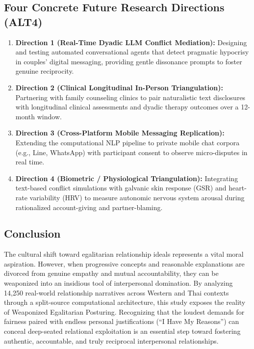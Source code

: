 \subsection{Four Concrete Future Research Directions (ALT4)}
\begin{enumerate}[leftmargin=*]
    \item \textbf{Direction 1 (Real-Time Dyadic LLM Conflict Mediation):} Designing and testing automated conversational agents that detect pragmatic hypocrisy in couples' digital messaging, providing gentle dissonance prompts to foster genuine reciprocity.
    \item \textbf{Direction 2 (Clinical Longitudinal In-Person Triangulation):} Partnering with family counseling clinics to pair naturalistic text disclosures with longitudinal clinical assessments and dyadic therapy outcomes over a 12-month window.
    \item \textbf{Direction 3 (Cross-Platform Mobile Messaging Replication):} Extending the computational NLP pipeline to private mobile chat corpora (e.g., Line, WhatsApp) with participant consent to observe micro-disputes in real time.
    \item \textbf{Direction 4 (Biometric / Physiological Triangulation):} Integrating text-based conflict simulations with galvanic skin response (GSR) and heart-rate variability (HRV) to measure autonomic nervous system arousal during rationalized account-giving and partner-blaming.
\end{enumerate}

\subsection{Conclusion}
The cultural shift toward egalitarian relationship ideals represents a vital moral aspiration. However, when progressive concepts and reasonable explanations are divorced from genuine empathy and mutual accountability, they can be weaponized into an insidious tool of interpersonal domination. By analyzing 14,250 real-world relationship narratives across Western and Thai contexts through a split-source computational architecture, this study exposes the reality of Weaponized Egalitarian Posturing. Recognizing that the loudest demands for fairness paired with endless personal justifications (``I Have My Reasons'') can conceal deep-seated relational exploitation is an essential step toward fostering authentic, accountable, and truly reciprocal interpersonal relationships.
